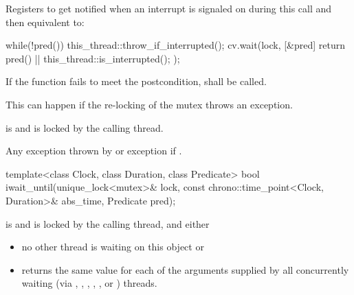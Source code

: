 {\begin{itemdescr}
{\color{diffcolor}
  \pnum\effects Registers  to get notified when an interrupt is signaled on 
                during this call and then equivalent to:
\begin{codeblock}
while(!pred()) {
  this_thread::throw_if_interrupted();
  cv.wait(lock, [&pred] {
                  return pred() || this_thread::is_interrupted();
                });
}
\end{codeblock}
}%
  
 \pnum \remarks
        If the function fails to meet the postcondition, 
        shall be called.
        \begin{note} This can happen if the re-locking of the mutex throws an exception. \end{note}

 \pnum \postconditions {} is  and 
        is locked by the calling thread.

 \pnum \throws Any exception thrown by 
                {\color{diffcolor}or exception  if
                 }.

\end{itemdescr}



%
\begin{itemdecl}
template<class Clock, class Duration, class Predicate>
  bool iwait_until(unique_lock<mutex>& lock,
                   const chrono::time_point<Clock, Duration>& abs_time,
                   Predicate pred);
\end{itemdecl}
\begin{itemdescr}
 \pnum \requires {} is  and  is
                locked by the calling thread, and either

        \begin{itemize}
        \item no other thread is waiting on this  object or
        \item {} returns the same value for each of the 
                arguments supplied by all concurrently waiting (via ,
                , ,
                {\color{insertcolor} , , or }) threads.
        \end{itemize}


\end{itemdescr}}
